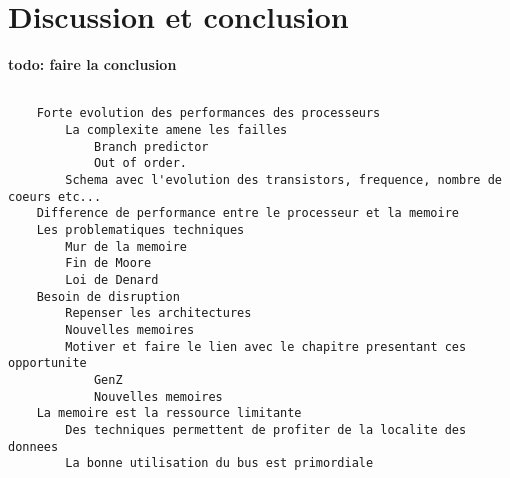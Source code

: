 \section{Discussion et conclusion}\label{sec:materiel_conclusion}


\textbf{todo: faire la conclusion}


    \begin{lstlisting}
    
	Forte evolution des performances des processeurs
		La complexite amene les failles
			Branch predictor
			Out of order.
		Schema avec l'evolution des transistors, frequence, nombre de coeurs etc...
	Difference de performance entre le processeur et la memoire
	Les problematiques techniques
		Mur de la memoire
		Fin de Moore
		Loi de Denard
	Besoin de disruption
		Repenser les architectures
		Nouvelles memoires
		Motiver et faire le lien avec le chapitre presentant ces opportunite
			GenZ
			Nouvelles memoires
    La memoire est la ressource limitante
		Des techniques permettent de profiter de la localite des donnees
		La bonne utilisation du bus est primordiale

	\end{lstlisting}